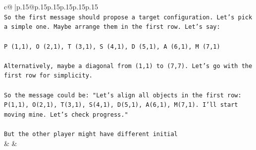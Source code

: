 \documentclass{article}
\begin{document}
{\begin{supertabular}{c@{$\;$}|p{.15\linewidth}@{}p{.15\linewidth}p{.15\linewidth}p{.15\linewidth}p{.15\linewidth}p{.15\linewidth}}
{{{\\ 
\texttt{So the first message should propose a target configuration. Let's pick a simple one. Maybe arrange them in the first row. Let's say:} \\
\\ 
\texttt{P (1,1), O (2,1), T (3,1), S (4,1), D (5,1), A (6,1), M (7,1)} \\
\\ 
\texttt{Alternatively, maybe a diagonal from (1,1) to (7,7). Let's go with the first row for simplicity.} \\
\\ 
\texttt{So the message could be: "Let's align all objects in the first row: P(1,1), O(2,1), T(3,1), S(4,1), D(5,1), A(6,1), M(7,1). I'll start moving mine. Let's check progress."} \\
\\ 
\texttt{But the other player might have different initial} \\
            }
        }
    }
    & & \\ \\


\end{supertabular}}
\end{document}
